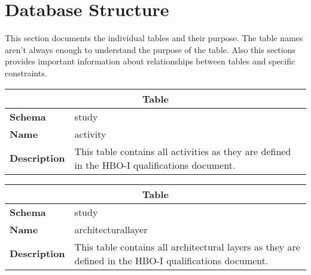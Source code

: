 \section{Database Structure}

This section documents the individual tables and their purpose.
The table names aren't always enough to understand the purpose of the table.
Also this sections provides important information about relationships between tables and specific constraints.

\newcommand{\tableref}[1]{\hyperref[table:#1]{#1}}

\renewcommand{\arraystretch}{2}
\begin{table}[H]
	\label{table:activity}
	\centering
	\begin{tabular}{|p{}|p{}|}
		\hline
		\multicolumn{2}{|c|}{\textbf{Table}} \\ \hline
		\textbf{Schema}               & study \\ \hline
		\textbf{Name}                 & activity \\ \hline
		\textbf{Description}          & This table contains all activities as they are defined in the HBO-I qualifications document. \\ \hline
	\end{tabular}
\end{table}

\begin{table}[H]
	\label{table:architecturallayer}
	\centering
	\begin{tabular}{|p{}|p{}|}
		\hline
		\multicolumn{2}{|c|}{\textbf{Table}} \\ \hline
		\textbf{Schema}               & study \\ \hline
		\textbf{Name}                 & architecturallayer \\ \hline
		\textbf{Description}          & This table contains all architectural layers as they are defined in the HBO-I qualifications document. \\ \hline
	\end{tabular}
\end{table}

